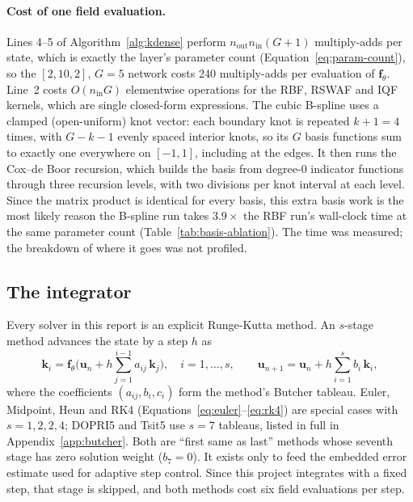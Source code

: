 \paragraph{Cost of one field evaluation.} Lines 4--5 of
Algorithm~\ref{alg:kdense} perform $n_{\text{out}}n_{\text{in}}(G+1)$
multiply-adds per state, which is exactly the layer's parameter count
(Equation~\ref{eq:param-count}), so the $[2,10,2]$, $G=5$ network costs 240
multiply-adds per evaluation of $\mathbf f_\theta$. Line~2 costs
$O(n_{\text{in}}G)$ elementwise operations for the RBF, RSWAF and IQF kernels,
which are single closed-form expressions. The cubic B-spline uses a clamped
(open-uniform) knot vector: each boundary knot is repeated $k+1=4$ times,
with $G-k-1$ evenly spaced interior knots, so its $G$ basis functions sum to
exactly one everywhere on $[-1,1]$, including at the edges. It then runs the
Cox--de Boor recursion, which builds the basis from degree-0 indicator
functions through three recursion levels, with two divisions per knot
interval at each level. Since the matrix product is
identical for every basis, this extra basis work is the most likely reason
the B-spline run takes $3.9\times$ the RBF run's wall-clock time at the same
parameter count (Table~\ref{tab:basis-ablation}). The time was measured; the
breakdown of where it goes was not profiled.

\subsection{The integrator}

Every solver in this report is an explicit Runge-Kutta method. An $s$-stage
method advances the state by a step $h$ as
\begin{equation}
\mathbf k_i=\mathbf f_\theta\Big(\mathbf u_n+h\sum_{j=1}^{i-1}a_{ij}\,\mathbf k_j\Big),\quad i=1,\dots,s,
\qquad
\mathbf u_{n+1}=\mathbf u_n+h\sum_{i=1}^{s}b_i\,\mathbf k_i,
\label{eq:rk-general}
\end{equation}
where the coefficients $(a_{ij},b_i,c_i)$ form the method's Butcher tableau.
Euler, Midpoint, Heun and RK4 (Equations~\ref{eq:euler}--\ref{eq:rk4}) are
special cases with $s=1,2,2,4$; DOPRI5 \cite{dormand1980dopri} and Tsit5
\cite{tsitouras2011tsit5} use $s=7$ tableaus, listed in full in
Appendix~\ref{app:butcher}. Both are ``first same as last'' methods whose
seventh stage has zero solution weight ($b_7=0$). It exists only to feed the
embedded error estimate used for adaptive step control. Since this project
integrates with a fixed step, that stage is skipped, and both methods cost
six field evaluations per step.

